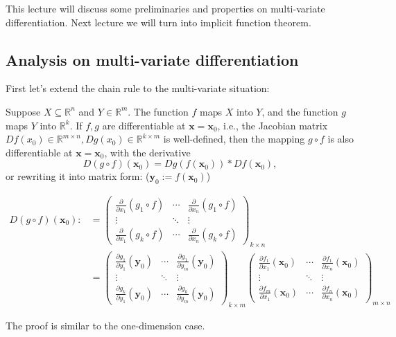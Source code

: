 This lecture will discuss some preliminaries and properties on multi-variate differentiation. Next lecture we will turn into implicit function theorem.

\subsection{Analysis on multi-variate differentiation}
First let's extend the chain rule to the multi-variate situation:
\begin{definition}[Composition]
Suppose $X\subseteq\mathbb{R}^n$ and $Y\in\mathbb{R}^m$.  The function $f$ maps $X$ into $Y$, and the function $g$ maps $Y$ into $\mathbb{R}^k$. If $f,g$ are differentiable at $\bm x=\bm x_0$, i.e., the Jacobian matrix $Df(x_0)\in\mathbb{R}^{m\times n},Dg(x_0)\in\mathbb{R}^{k\times m}$ is well-defined, then the mapping $g\circ f$ is also differentiable at $\bm x=\bm x_0$, with the derivative
\[
D(g\circ f)(\bm x_0)
=
Dg(f(\bm x_0))* Df(\bm x_0),
\]
or rewriting it into matrix form: ($\bm y_0:=f(\bm x_0)$)
\item
\begin{align*}
D(g\circ f)(\bm x_0):&=\begin{pmatrix}
\frac{\partial }{\partial x_1}(g_1\circ f)&\cdots&\frac{\partial }{\partial x_n}(g_1\circ f)\\
\vdots&\ddots&\vdots\\
\frac{\partial }{\partial x_1}(g_k\circ f)&\cdots&\frac{\partial }{\partial x_n}(g_k\circ f)
\end{pmatrix}_{k\times n}\\
&=
\begin{pmatrix}
\frac{\partial g_1}{\partial y_1}(\bm y_0)&\cdots&\frac{\partial g_1}{\partial y_m}(\bm y_0)\\
\vdots&\ddots&\vdots\\
\frac{\partial g_k}{\partial y_1}(\bm y_0)&\cdots&\frac{\partial g_k}{\partial y_m}(\bm y_0)
\end{pmatrix}_{k\times m}
\begin{pmatrix}
\frac{\partial f_1}{\partial x_1}(\bm x_0)&\cdots&\frac{\partial f_1}{\partial x_n}(\bm x_0)\\
\vdots&\ddots&\vdots\\
\frac{\partial f_m}{\partial x_1}(\bm x_0)&\cdots&\frac{\partial f_n}{\partial x_n}(\bm x_0)
\end{pmatrix}_{m\times n}
\end{align*}
\end{definition}
The proof is similar to the one-dimension case.


